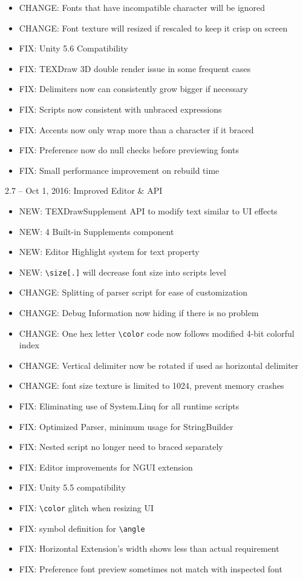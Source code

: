 \documentclass[12pt]{article}
\begin{document}
\begin{itemize}
\item CHANGE: Fonts that have incompatible character will be ignored
\item CHANGE: Font texture will resized if rescaled to keep it crisp on screen
\item FIX: Unity 5.6 Compatibility
\item FIX: TEXDraw 3D double render issue in some frequent cases
\item FIX: Delimiters now can consistently grow bigger if necessary
\item FIX: Scripts now consistent with unbraced expressions
\item FIX: Accents now only wrap more than a character if it braced
\item FIX: Preference now do null checks before previewing fonts
\item FIX: Small performance improvement on rebuild time
\end{itemize}

2.7 – Oct 1, 2016: Improved Editor \& API
\begin{itemize}
\item NEW: TEXDrawSupplement API to modify text similar to UI effects
\item NEW: 4 Built-in Supplements component
\item NEW: Editor Highlight system for text property
\item NEW: \verb|\size[.]| will decrease font size into scripts level
\item CHANGE: Splitting of parser script for ease of customization
\item CHANGE: Debug Information now hiding if there is no problem
\item CHANGE: One hex letter \verb|\color| code now follows modified 4-bit colorful index
\item CHANGE: Vertical delimiter now be rotated if used as horizontal delimiter
\item CHANGE: font size texture is limited to 1024, prevent memory crashes
\item FIX: Eliminating use of System.Linq for all runtime scripts
\item FIX: Optimized Parser, minimum usage for StringBuilder
\item FIX: Nested script no longer need to braced separately
\item FIX: Editor improvements for NGUI extension
\item FIX: Unity 5.5 compatibility
\item FIX: \verb|\color| glitch when resizing UI
\item FIX: symbol definition for \verb|\angle|
\item FIX: Horizontal Extension’s width shows less than actual requirement
\item FIX: Preference font preview sometimes not match with inspected font
\end{itemize}
\end{document}
